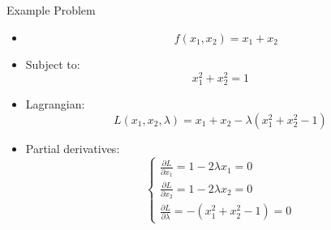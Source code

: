 \documentclass[serif, aspectratio=169]{beamer}
\begin{document}



\begin{frame}{Example Problem}
\begin{itemize}
    \item {}
        \[
 \quad f(x_1, x_2) = x_1 + x_2
\]
    \item Subject to:
    \[
x_1^2 + x_2^2 = 1
\]
    \item Lagrangian:
    \[
L(x_1, x_2, \lambda) = x_1 + x_2 - \lambda (x_1^2 + x_2^2 - 1)
\]
    \item Partial derivatives:
    \[
\begin{cases}
\frac{\partial L}{\partial x_1} = 1 - 2\lambda x_1 = 0 \\
\frac{\partial L}{\partial x_2} = 1 - 2\lambda x_2 = 0 \\
\frac{\partial L}{\partial \lambda} = -(x_1^2 + x_2^2 - 1) = 0
\end{cases}
\]
\end{itemize}
\end{frame}
\end{document}
